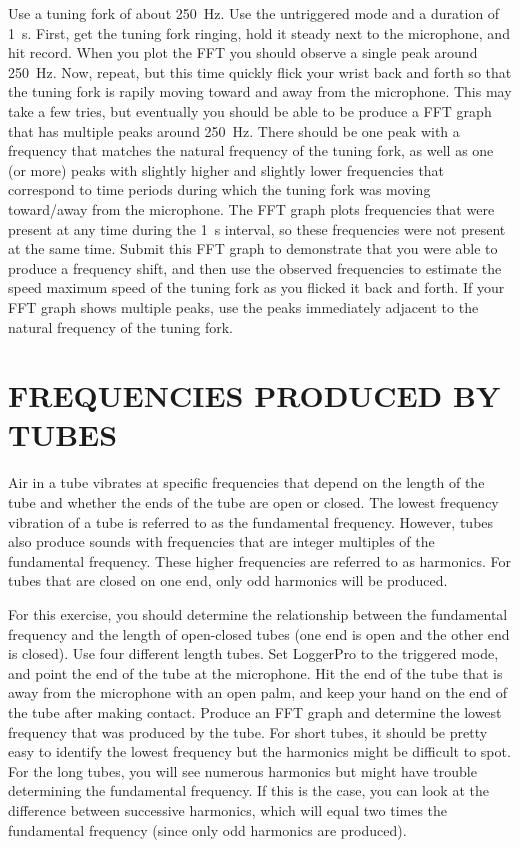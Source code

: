 \documentclass[11pt,letterpaper]{article}
\begin{document}
Use a tuning fork of about 250~Hz. Use the untriggered mode and a duration of 1~s. First, get the tuning fork ringing, hold it steady next to the microphone, and hit record. When you plot the FFT you should observe a single peak around 250~Hz. Now, repeat, but this time quickly flick your wrist back and forth so that the tuning fork is rapily moving toward and away from the microphone. This may take a few tries, but eventually you should be able to be produce a FFT graph that  has multiple peaks around 250~Hz. There should be one peak with a frequency that matches the natural frequency of the tuning fork, as well as one (or more) peaks with slightly higher and slightly lower frequencies that correspond to time periods during which the tuning fork was moving toward/away from the microphone. The FFT graph plots frequencies that were present at any time during the 1~s interval, so these frequencies were not present at the same time. Submit this FFT graph to demonstrate that you were able to produce a frequency shift, and then use the observed frequencies to estimate the speed maximum speed of the tuning fork as you flicked it back and forth. If your FFT graph shows multiple peaks, use the peaks immediately adjacent to the natural frequency of the tuning fork.


\section{FREQUENCIES PRODUCED BY TUBES}
Air in a tube vibrates at specific frequencies that depend on the length of the tube and whether the ends of the tube are open or closed. The lowest frequency vibration of a tube is referred to as the fundamental frequency. However, tubes also produce sounds with frequencies that are integer multiples of the fundamental frequency. These higher frequencies are referred to as harmonics. For tubes that are closed on one end, only odd harmonics will be produced.

For this exercise, you should determine the relationship between the fundamental frequency and the length of open-closed tubes (one end is open and the other end is closed). Use four different length tubes. Set LoggerPro to the triggered mode, and point the end of the tube at the microphone. Hit the end of the tube that is away from the microphone with an open palm, and keep your hand on the end of the tube after making contact. Produce an FFT graph and determine the lowest frequency that was produced by the tube. For short tubes, it should be pretty easy to identify the lowest frequency but the harmonics might be difficult to spot. For the long tubes, you will see numerous harmonics but might have trouble determining the fundamental frequency. If this is the case, you can look at the difference between successive harmonics, which will equal two times the fundamental frequency (since only odd harmonics are produced).
\end{document}
